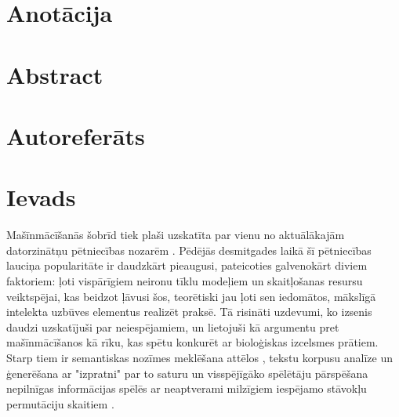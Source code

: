 \documentclass[12pt, a4paper]{article}
\numberwithin{equation}{section} %
\begin{document}

\newpage

\section*{Anotācija}
\thispagestyle{empty}

\newpage
{}
\section*{Abstract}
\thispagestyle{empty}


\newpage
{}
\section*{Autoreferāts}
\thispagestyle{empty}
\newpage

\newpage

\tableofcontents
\thispagestyle{empty}
\newpage
\setcounter{page}{7}

\section*{Ievads} %


Mašīnmācīšanās šobrīd tiek plaši uzskatīta par vienu no aktuālākajām datorzinātņu pētniecības nozarēm \cite{no_shit}. Pēdējās desmitgades laikā šī pētniecības lauciņa popularitāte ir daudzkārt pieaugusi, pateicoties galvenokārt diviem faktoriem: ļoti vispārīgiem neironu tīklu modeļiem un skaitļošanas resursu veiktspējai, kas beidzot ļāvusi šos, teorētiski jau ļoti sen \cite{mcculloch1943logical, linnainmaa1970representation, fukushima1988neocognitron} iedomātos, mākslīgā intelekta uzbūves elementus realizēt praksē. Tā risināti uzdevumi, ko izsenis daudzi uzskatījuši par neiespējamiem, un lietojuši kā argumentu pret mašīnmācīšanos kā rīku, kas spētu konkurēt ar bioloģiskas izcelsmes prātiem. Starp tiem ir semantiskas nozīmes meklēšana attēlos \cite{krizhevsky2012imagenet}, tekstu korpusu analīze un ģenerēšana ar "izpratni" par to saturu \cite{vaswani2017attention} un visspējīgāko spēlētāju pārspēšana nepilnīgas informācijas spēlēs ar neaptverami milzīgiem iespējamo stāvokļu permutāciju skaitiem \cite{silver2016mastering}.
\end{document}
